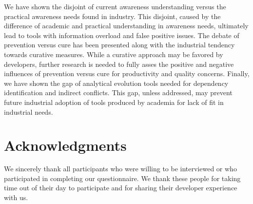 \documentclass[conference]{IEEEtran}
\begin{document}
We have shown the disjoint of current awareness understanding versus the practical
awareness needs found in industry. This disjoint, caused by the difference of academic and practical understanding in awareness needs,
ultimately lead to tools with information overload and false positive issues. The debate of prevention versus cure has been presented along with
the industrial tendency towards curative measures. While a curative approach may be favored by developers, further research is needed
to fully asses the positive and negative influences of prevention versus cure for productivity and quality concerns. Finally, we have shown
the gap of analytical evolution tools needed for dependency identification and indirect conflicts. This gap, unless addressed, may prevent
future industrial adoption of tools produced by academia for lack of fit in industrial needs.

\section{Acknowledgments}

We sincerely thank all participants who were willing to be interviewed or who participated
in completing our questionnaire. We thank these people for taking time out of their day to participate and for
sharing their developer experience with us.




\end{document}
